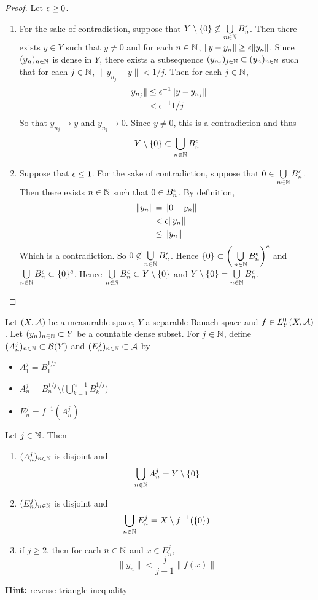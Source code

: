 \documentclass{book}
\begin{document}
	\begin{proof}
	Let $\epsilon \geq 0$. 
	\begin{enumerate}
		\item For the sake of contradiction, suppose that $Y\setminus \{ 0 \} \not \subset \bigcup\limits_{n \in \mathbb{N}}B^{\epsilon}_n$. Then there exists $y \in Y$ such that $y \neq 0$ and for each $n \in \mathbb{N}$, $\|y- y_n\| \geq \epsilon \|y_n\|$. Since $(y_n)_{n \in \mathbb{N}}$ is dense in $Y$, there exists a subsequence $(y_{n_j})_{j \in \mathbb{N}} \subset (y_n)_{n \in \mathbb{N}}$ such that for each $j \in \mathbb{N}$, $\|y_{n_j} - y\| < 1/j$. Then for each $j \in \mathbb{N}$,
		\begin{align*}
			\|y_{n_j}\| 
			& \leq  \epsilon^{-1}\|y- y_{n_j}\| \\
			& < \epsilon^{-1}1/j
		\end{align*}
		So that $y_{n_j} \rightarrow y$ and $y_{n_j} \rightarrow 0$. Since $y \neq 0$, this is a contradiction and thus $$Y \setminus \{ 0 \} \subset \bigcup\limits_{n \in \mathbb{N}}B^{\epsilon}_n$$ 
		\item Suppose that $\epsilon \leq 1$. For the sake of contradiction, suppose that $0 \in \bigcup\limits_{n \in \mathbb{N}}B^{\epsilon}_n $. Then there exists $n \in \mathbb{N}$ such that $0 \in B^{\epsilon}_n$.  By definition, 
		\begin{align*}
			\|y_n\| 
			& = \|0 - y_n\| \\
			& < \epsilon \|y_n\| \\
			& \leq \|y_n\|
		\end{align*}
		Which is a contradiction. So $0 \not \in  \bigcup\limits_{n \in \mathbb{N}}B^{\epsilon}_n$. Hence $\{0\} \subset \bigg( \bigcup\limits_{n \in \mathbb{N}}B^{\epsilon}_n \bigg)^c$ and $ \bigcup\limits_{n \in \mathbb{N}}B^{\epsilon}_n \subset \{0\}^c$. Hence $ \bigcup\limits_{n \in \mathbb{N}}B^{\epsilon}_n \subset Y \setminus \{0\}$ and $Y \setminus \{ 0 \} = \bigcup\limits_{n \in \mathbb{N}}B^{\epsilon}_n$.
	\end{enumerate}
	\end{proof}

	\begin{ex}
	Let $(X, \mathcal{A})$ be a measurable space, $Y$ a separable Banach space and $f \in L^0_Y(X, \mathcal{A})$.  Let $(y_n)_{n \in \mathbb{N}} \subset Y$ be a countable dense subset. For $j \in \mathbb{N}$, define $(A_n^j)_{n \in \mathbb{N}} \subset \mathcal{B}(Y)$ and $(E_n^j)_{n \in \mathbb{N}} \subset \mathcal{A}$ by  
	\begin{itemize}
			\item $A_1^j = B^{1/j}_1$ 
			\item $A_n^j = B^{1/j}_n  \setminus \bigg( \bigcup \limits_{k=1}^{n-1} B^{1/j}_k \bigg)$ 
			\item $E_n^j = f^{-1}(A^j_n)$ 
	\end{itemize}
	Let $j \in \mathbb{N}$. Then
	\begin{enumerate}
		\item $(A_n^j)_{n \in \mathbb{N}}$ is disjoint and $$\bigcup_{n \in \mathbb{N}}A_n^j = Y \setminus \{0\}$$
		\item $(E_n^j)_{n \in \mathbb{N}}$ is disjoint and $$\bigcup_{n \in \mathbb{N}}E_n^j = X \setminus f^{-1}(\{0\})$$
		\item if $j \geq 2$, then for each $n \in \mathbb{N}$ and $x \in E_n^j$, $$\|y_n\| < \frac{j}{j-1} \|f(x)\|$$
	\end{enumerate}
	\textbf{Hint:} reverse triangle inequality
	\end{ex}
\end{document}
